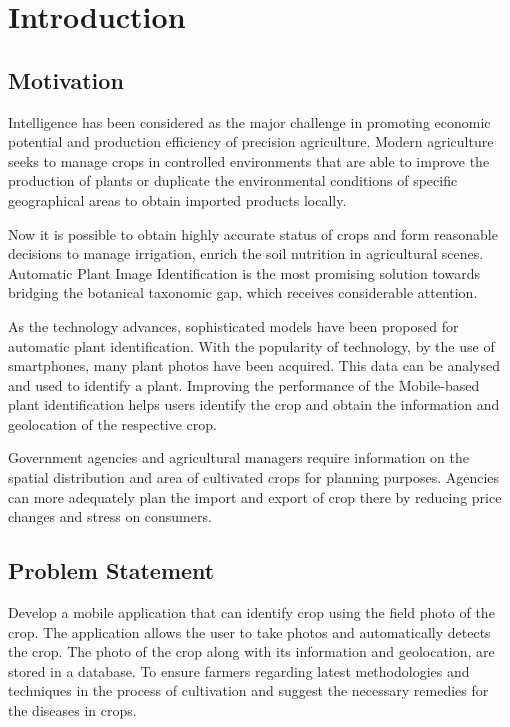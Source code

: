 \documentclass[../Report.tex]{subfiles}
\begin{document}
\chapter{Introduction}

\section{Motivation}

Intelligence has been considered as the major challenge in promoting economic potential and production efficiency of precision
agriculture. Modern agriculture seeks to manage crops in controlled environments that are able to improve the production of plants or
duplicate the environmental conditions of specific geographical areas to obtain imported products locally.\par
Now it is possible to obtain highly accurate status of crops and form reasonable decisions to manage irrigation, enrich the soil
nutrition in agricultural scenes. Automatic Plant Image Identification is the most promising solution towards bridging the botanical
taxonomic gap, which receives considerable attention.\par
As the technology advances, sophisticated models have been proposed for automatic plant identification. With the popularity of technology, 
by the use of smartphones, many plant photos have been acquired. This data can be analysed and used to identify a plant. Improving the 
performance of the Mobile-based plant identification helps users identify the crop and obtain the information and geolocation of the 
respective crop.\par
Government agencies and agricultural managers require information on the spatial distribution and area of cultivated crops for planning 
purposes. Agencies can more adequately plan the import and export of crop there by reducing price changes and stress on consumers.

\section{Problem Statement}

Develop a mobile application that can identify crop using the field photo of the crop. The application allows the user to take photos 
and automatically detects the crop. The photo of the crop along with its information and geolocation, are stored in a database. To ensure 
farmers regarding latest methodologies and techniques in the process of cultivation and suggest the necessary remedies for the 
diseases in crops.\par
\end{document}
